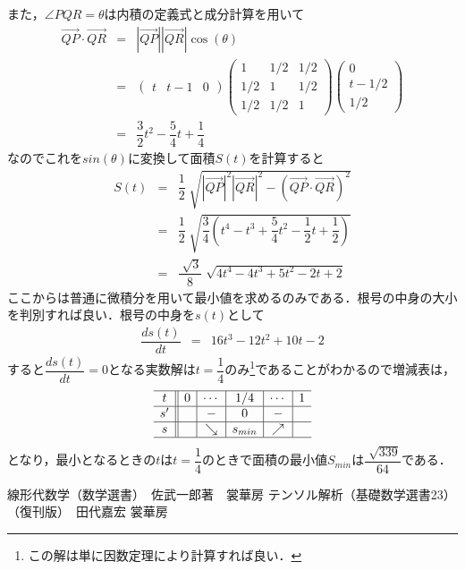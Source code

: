 \documentclass[dvipdfmx,a4]{jsarticle}
\begin{document}
また，\(\angle PQR=\theta\)は内積の定義式と成分計算を用いて
\begin{eqnarray*}
  \overrightarrow{QP}\cdot \overrightarrow{QR}
  &=&
  |\overrightarrow{QP}||\overrightarrow{QR}| \cos(\theta)\\
  &=&
  \begin{pmatrix}
    t & t-1 & 0
  \end{pmatrix}
  \begin{pmatrix}
    1   & 1/2 & 1/2 \\
    1/2 & 1   & 1/2 \\
    1/2 & 1/2 & 1
  \end{pmatrix}
  \begin{pmatrix}
    0     \\
    t-1/2 \\
    1/2
  \end{pmatrix}\\
  &=&
  \dfrac{3}{2}t^2-\dfrac{5}{4}t+\dfrac{1}{4}
\end{eqnarray*}
なのでこれを\(sin(\theta)\)に変換して面積\(S(t)\)を計算すると
\begin{eqnarray*}
  S(t) &=&
  \dfrac{1}{2}\sqrt[]{|\overrightarrow{QP}|^2|\overrightarrow{QR}|^2 -(\overrightarrow{QP}\cdot \overrightarrow{QR})^2}\\
  &=& \dfrac{1}{2} \sqrt[]{\dfrac{3}{4} \left( t^4 -t^3 +\dfrac{5}{4} t^2 -\dfrac{1}{2} t+\dfrac{1}{2}\right)} \\
  &=& \dfrac{\sqrt[]{3}}{8} \sqrt[]{4t^4 -4t^3 +5 t^2 -2 t+2}
\end{eqnarray*}
ここからは普通に微積分を用いて最小値を求めるのみである．根号の中身の大小を判別すれば良い．根号の中身を\(s(t)\)として
\begin{eqnarray*}
  \dfrac{ds(t)}{dt} &=&
  16t^3-12t^2+10t-2
\end{eqnarray*}
すると\(\dfrac{ds(t)}{dt}=0\)となる実数解は\(t=\dfrac{1}{4}\)のみ\footnote{この解は単に因数定理により計算すれば良い．}であることがわかるので増減表は，
\[
  \begin{array}{c||c|c|c|c|c}
    \hline
    t  & 0 & \cdots   & 1/4     & \cdots   & 1 \\
    \hline
    s' &   & -        & 0       & -        &   \\
    \hline
    s  &   & \searrow & s_{min} & \nearrow &   \\
    \hline
  \end{array}
\]
となり，最小となるときの\(t\)は\(t=\dfrac{1}{4}\)のときで面積の最小値\(S_{min}\)は\(\dfrac{\sqrt[]{339}}{64}\)である．

\begin{thebibliography}{9}
   線形代数学（数学選書）　佐武一郎著　裳華房
   テンソル解析（基礎数学選書23）（復刊版）　田代嘉宏 裳華房
\end{thebibliography}
\end{document}
